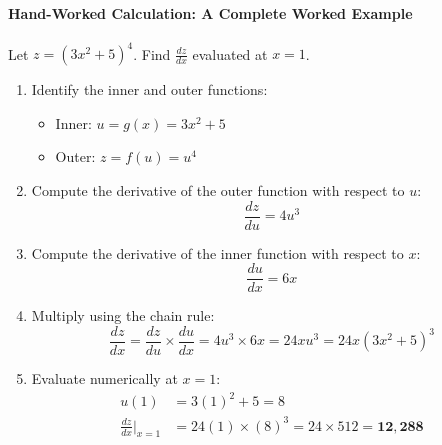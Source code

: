 \paragraph{Hand-Worked Calculation: A Complete Worked Example}
Let $z = (3x^2 + 5)^4$. Find $\frac{dz}{dx}$ evaluated at $x = 1$.
\begin{enumerate}
    \item Identify the inner and outer functions:
    \begin{itemize}
        \item Inner: $u = g(x) = 3x^2 + 5$
        \item Outer: $z = f(u) = u^4$
    \end{itemize}

    \item Compute the derivative of the outer function with respect to $u$:
    \begin{equation*}
    \frac{dz}{du} = 4u^3
    \end{equation*}

    \item Compute the derivative of the inner function with respect to $x$:
    \begin{equation*}
    \frac{du}{dx} = 6x
    \end{equation*}

    \item Multiply using the chain rule:
    \begin{equation*}
    \frac{dz}{dx} = \frac{dz}{du} \times \frac{du}{dx} = 4u^3 \times 6x = 24x u^3 = 24x (3x^2 + 5)^3
    \end{equation*}

    \item Evaluate numerically at $x = 1$:
    \begin{align*}
    u(1) &= 3(1)^2 + 5 = 8 \\
    \frac{dz}{dx}\Big|_{x=1} &= 24(1) \times (8)^3 = 24 \times 512 = \mathbf{12{,}288}
    \end{align*}
\end{enumerate}

